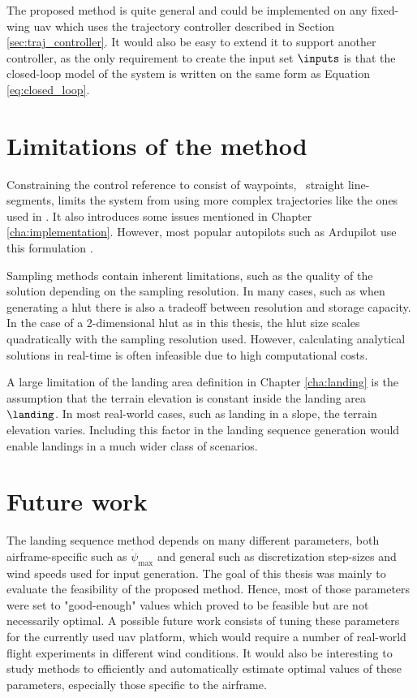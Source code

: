 The proposed method is quite general and could be implemented on any fixed-wing \ac{uav} which uses the trajectory controller described in Section \ref{sec:traj_controller}. 
It would also be easy to extend it to support another controller, as the only requirement to create the input set $\inputs$ is that the closed-loop model of the system is written on the same form as 
Equation \ref{eq:closed_loop}.

\section{Limitations of the method}
Constraining the control reference to consist of waypoints, \ie\ straight line-segments, limits the system from using more complex trajectories like the ones used in \cite{emergency_landing}. It also introduces some issues mentioned in Chapter \ref{cha:implementation}. 
However, most popular autopilots such as Ardupilot use this formulation \cite{arduplane}. 

Sampling methods contain inherent limitations, such as the 
quality of the solution depending on the sampling resolution. In many cases, such as when generating a \ac{hlut} there is also a tradeoff between resolution and storage capacity. In the case of a 2-dimensional \ac{hlut} as in this thesis, the \ac{hlut} size scales quadratically with the sampling resolution used. 
However, calculating analytical solutions in real-time is often infeasible due to high computational costs.

A large limitation of the landing area definition in Chapter \ref{cha:landing} is the assumption that the terrain elevation is constant inside the landing area $\landing$. In 
most real-world cases, such as landing in a slope, the terrain elevation varies. Including this factor in the landing sequence generation would enable landings in a much wider class of scenarios.

\section{Future work}
The landing sequence method depends on many different parameters, both airframe-specific such as $\dot{\psi}_{\text{max}}$ and general such as discretization step-sizes and wind speeds used for input generation.
The goal of this thesis was mainly to evaluate the feasibility of the proposed method. Hence, most of those parameters were set to "good-enough" values which proved to be feasible but are not necessarily optimal. 
A possible future work consists of tuning these parameters for the currently used \ac{uav} platform, which would require a number of real-world flight experiments in different wind conditions.
It would also be interesting to study methods to efficiently and automatically estimate optimal values of these parameters, especially those specific to the airframe.

